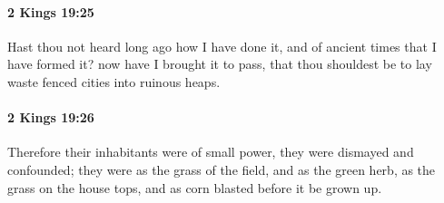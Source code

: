 		\paragraph{2 Kings 19:25} %
			\label{2KINGS-19-25}

			Hast thou not heard long ago how I have done it, and of ancient times that I have formed it? now have I brought it to pass, that thou shouldest be to lay waste fenced cities into ruinous heaps.


		\paragraph{2 Kings 19:26} %
			\label{2KINGS-19-26}

			Therefore their inhabitants were of small power, they were dismayed and confounded; they were as the grass of the field, and as the green herb, as the grass on the house tops, and as corn blasted before it be grown up.

